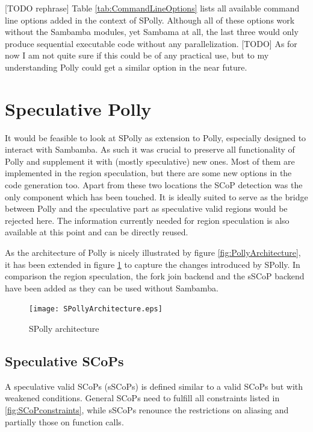 
[TODO rephrase] 
Table \ref{tab:CommandLineOptions} lists all available command line options 
added in the context of SPolly. Although all of these options work 
without the Sambamba modules, yet Sambama at all, the last three would only 
produce sequential executable code without any parallelization. 
[TODO] As for now I am not quite sure if this could be of any practical use, 
but to my understanding Polly could get a similar option in the near future. 





\section{Speculative Polly}
It would be feasible to look at SPolly as extension to Polly, especially designed
to interact with Sambamba. As such it was crucial to preserve all functionality 
of Polly and supplement it with (mostly speculative) new ones. Most of them are
implemented in the region speculation, but there are some new options in the 
code generation too. Apart from these two locations the SCoP detection was the 
only component which has been touched. It is ideally suited to serve as the 
bridge between Polly and the speculative part as speculative valid regions 
would be rejected here. The information currently needed for region speculation
is also available at this point and can be directly reused. 

As the architecture of Polly is nicely illustrated by figure 
\ref{fig:PollyArchitecture}, it has been extended in figure 
\ref{fig:SPollyArchitecture} to capture the changes introduced by SPolly. 
In comparison the region speculation, the fork join backend and the sSCoP
backend have been added as they can be used without Sambamba. 

\begin{figure}[htbp]
  \centering
  \texttt{[image: SPollyArchitecture.eps]}
  \caption{SPolly architecture}
  \label{fig:SPollyArchitecture}  
\end{figure}


\subsection{Speculative SCoPs}
A speculative valid SCoPs (sSCoPs) is defined similar to a valid SCoPs but with 
weakened conditions. General SCoPs need to fulfill all constraints listed in
\ref{fig:SCoPconstraints}, while sSCoPs renounce the restrictions on aliasing
and partially those on function calls. 


